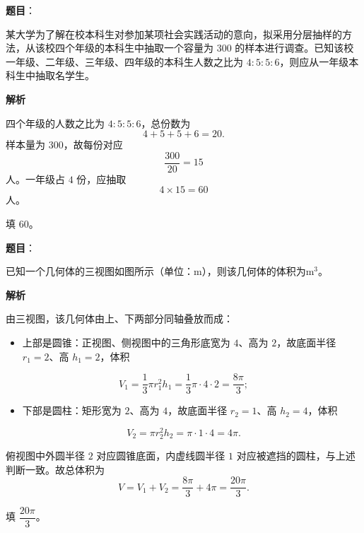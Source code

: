 \begin{answer}

\textbf{题目}：

某大学为了解在校本科生对参加某项社会实践活动的意向，拟采用分层抽样的方法，从该校四个年级的本科生中抽取一个容量为 $300$ 的样本进行调查。已知该校一年级、二年级、三年级、四年级的本科生人数之比为 $4:5:5:6$，则应从一年级本科生中抽取\gkblank{}名学生。

\textbf{解析}

四个年级的人数之比为 $4:5:5:6$，总份数为
\nopagebreak[4]
\[4+5+5+6=20.\]
样本量为 $300$，故每份对应
\nopagebreak[4]
\[\frac{300}{20}=15\]
人。一年级占 $4$ 份，应抽取
\nopagebreak[4]
\[4\times15=60\]
人。

填 $60$。


\end{answer}
\begin{answer}

\textbf{题目}：

已知一个几何体的三视图如图所示（单位：m），则该几何体的体积为\gkblank{}$\mathrm m^3$。
\nopagebreak[4]
\begin{center}\end{center}
\nopagebreak[4]
\textbf{解析}

由三视图，该几何体由上、下两部分同轴叠放而成：

\begin{itemize}
\item 上部是圆锥：正视图、侧视图中的三角形底宽为 $4$、高为 $2$，故底面半径 $r_1=2$、高 $h_1=2$，体积
\end{itemize}
\nopagebreak[4]
\[V_1=\frac13\pi r_1^2h_1=\frac13\pi\cdot4\cdot2=\frac{8\pi}{3};\]
\begin{itemize}
\item 下部是圆柱：矩形宽为 $2$、高为 $4$，故底面半径 $r_2=1$、高 $h_2=4$，体积
\end{itemize}
\nopagebreak[4]
\[V_2=\pi r_2^2h_2=\pi\cdot1\cdot4=4\pi.\]

俯视图中外圆半径 $2$ 对应圆锥底面，内虚线圆半径 $1$ 对应被遮挡的圆柱，与上述判断一致。故总体积为
\nopagebreak[4]
\[V=V_1+V_2=\frac{8\pi}{3}+4\pi=\frac{20\pi}{3}.\]

填 $\dfrac{20\pi}{3}$。


\end{answer}
